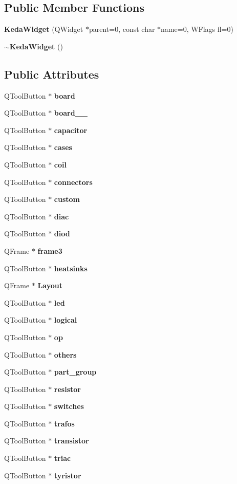 \subsection*{Public Member Functions}
\begin{CompactItemize}
\item 
{\bf Keda\-Widget} (QWidget $\ast$parent=0, const char $\ast$name=0, WFlags fl=0)
\item 
{\bf $\sim$Keda\-Widget} ()
\end{CompactItemize}
\subsection*{Public Attributes}
\begin{CompactItemize}
\item 
QTool\-Button $\ast$ {\bf board}
\item 
QTool\-Button $\ast$ {\bf board\_\_}
\item 
QTool\-Button $\ast$ {\bf capacitor}
\item 
QTool\-Button $\ast$ {\bf cases}
\item 
QTool\-Button $\ast$ {\bf coil}
\item 
QTool\-Button $\ast$ {\bf connectors}
\item 
QTool\-Button $\ast$ {\bf custom}
\item 
QTool\-Button $\ast$ {\bf diac}
\item 
QTool\-Button $\ast$ {\bf diod}
\item 
QFrame $\ast$ {\bf frame3}
\item 
QTool\-Button $\ast$ {\bf heatsinks}
\item 
QFrame $\ast$ {\bf Layout}
\item 
QTool\-Button $\ast$ {\bf led}
\item 
QTool\-Button $\ast$ {\bf logical}
\item 
QTool\-Button $\ast$ {\bf op}
\item 
QTool\-Button $\ast$ {\bf others}
\item 
QTool\-Button $\ast$ {\bf part\_\-group}
\item 
QTool\-Button $\ast$ {\bf resistor}
\item 
QTool\-Button $\ast$ {\bf switches}
\item 
QTool\-Button $\ast$ {\bf trafos}
\item 
QTool\-Button $\ast$ {\bf transistor}
\item 
QTool\-Button $\ast$ {\bf triac}
\item 
QTool\-Button $\ast$ {\bf tyristor}
\end{CompactItemize}
